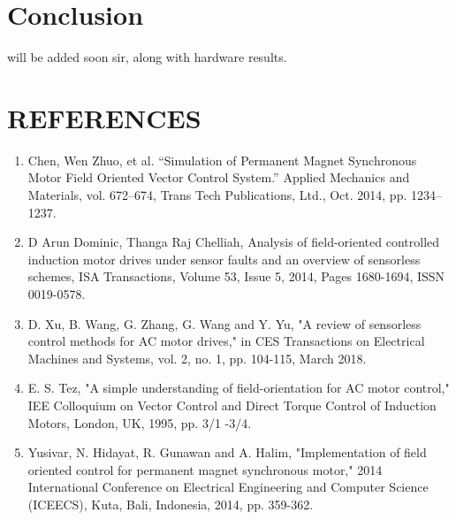 \section{Conclusion}

will be added soon sir, along with hardware results.

\newpage


\section{\centering REFERENCES}


\begin{enumerate}
\item Chen, Wen Zhuo, et al. “Simulation of Permanent Magnet Synchronous Motor Field Oriented Vector Control System.” Applied Mechanics and Materials, vol. 672–674, Trans Tech Publications, Ltd., Oct. 2014, pp. 1234–1237.


\vspace{5mm} %

\item D Arun Dominic, Thanga Raj Chelliah,
Analysis of field-oriented controlled induction motor drives under sensor faults and an overview of sensorless schemes,
ISA Transactions,
Volume 53, Issue 5,
2014,
Pages 1680-1694,
ISSN 0019-0578.

\vspace{5mm} %

\item D. Xu, B. Wang, G. Zhang, G. Wang and Y. Yu, "A review of sensorless control methods for AC motor drives," in CES Transactions on Electrical Machines and Systems, vol. 2, no. 1, pp. 104-115, March 2018.


\vspace{5mm} %

\item  E. S. Tez, "A simple understanding of field-orientation for AC motor control," IEE Colloquium on Vector Control and Direct Torque Control of Induction Motors, London, UK, 1995, pp. 3/1 -3/4.

\vspace{5mm} %


\item  Yusivar, N. Hidayat, R. Gunawan and A. Halim, "Implementation of field oriented control for permanent magnet synchronous motor," 2014 International Conference on Electrical Engineering and Computer Science (ICEECS), Kuta, Bali, Indonesia, 2014, pp. 359-362.

\end{enumerate}

